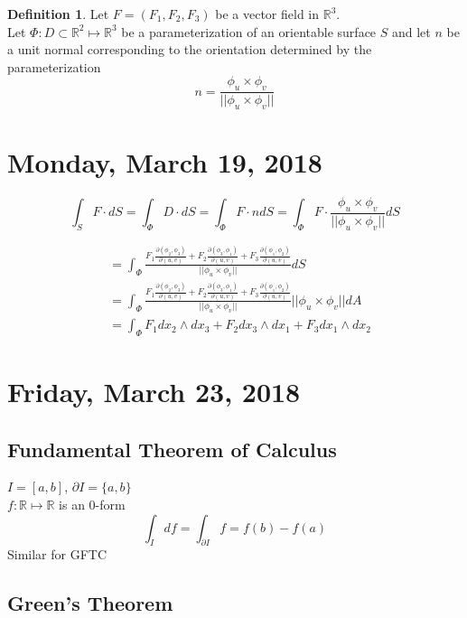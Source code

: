\documentclass[12pt]{article}
\theoremstyle{plain}
\theoremstyle{definition}
\newtheorem{definition}[theorem]{Definition}
\begin{document}
\begin{definition}
    Let $F = (F_1, F_2, F_3)$ be a vector field in $\mathbb{R}^3$.\\
    Let $\Phi : D \subset \mathbb{R}^2 \mapsto \mathbb{R}^3$ be a parameterization of an orientable surface $S$ and let $n$ be a unit normal corresponding to the orientation determined by the parameterization
    $$n = \frac{\phi_u \times \phi_v}{||\phi_u \times \phi_v||}$$
\end{definition}

\newpage

\section{Monday, March 19, 2018}

$$\int_S F \cdot dS = \int_\Phi D \cdot dS = \int_\Phi F \cdot n dS = \int_\Phi F \cdot \frac{\phi_u \times \phi_v}{||\phi_u \times \phi_v||} dS$$

\begin{align*}
    &=\int_\Phi \frac{F_1 \frac{\partial (\phi_2, \phi_3)}{\partial (u,v)} + F_2 \frac{\partial (\phi_3, \phi_1)}{\partial (u,v)}+F_3\frac{\partial (\phi_1, \phi_2)}{\partial (u,v)}}{||\phi_u \times \phi_v||} dS\\
    &=\int_\Phi \frac{F_1 \frac{\partial (\phi_2, \phi_3)}{\partial (u,v)} + F_2 \frac{\partial (\phi_3, \phi_1)}{\partial (u,v)}+F_3\frac{\partial (\phi_1, \phi_2)}{\partial (u,v)}}{||\phi_u \times \phi_v||} ||\phi_u \times \phi_v||dA\\
    &=\int_\Phi F_1 dx_2 \wedge dx_3 + F_2 dx_3 \wedge dx_1 + F_3 dx_1 \wedge dx_2
\end{align*}

\newpage

\section{Friday, March 23, 2018}

\subsection{Fundamental Theorem of Calculus}

$I = [a,b]$, $\partial I = \{ a,b \}$\\
$f:\mathbb{R}\mapsto\mathbb{R}$ is an 0-form\\
$$\int_I df = \int_{\partial I} f = f(b) - f(a)$$
Similar for GFTC

\subsection{Green's Theorem}
\end{document}

